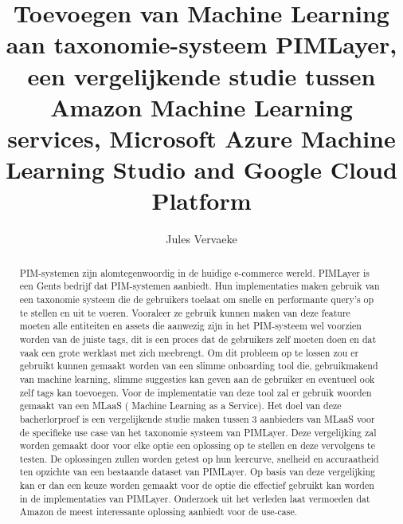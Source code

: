 \documentclass{hogent-article}
\title{Toevoegen van Machine Learning aan taxonomie-systeem PIMLayer, een vergelijkende studie tussen Amazon Machine Learning services, Microsoft Azure Machine Learning Studio and Google Cloud Platform}
\author{Jules Vervaeke}
\begin{document}
\begin{abstract}
  PIM-systemen zijn alomtegenwoordig in de huidige e-commerce wereld. PIMLayer is een Gents bedrijf dat PIM-systemen aanbiedt. Hun implementaties maken gebruik van een taxonomie systeem die de gebruikers toelaat om snelle en performante query's op te stellen en uit te voeren. Vooraleer ze gebruik kunnen maken van deze feature moeten alle entiteiten en assets die aanwezig zijn in het PIM-systeem wel voorzien worden van de juiste tags, dit is een proces dat de gebruikers zelf moeten doen en dat vaak een  grote werklast met zich meebrengt. Om dit probleem op te lossen zou er gebruikt kunnen gemaakt worden van een slimme onboarding tool die, gebruikmakend van machine learning, slimme suggesties kan geven aan de gebruiker en eventueel ook zelf tags kan toevoegen. Voor de implementatie van deze tool zal er gebruik woorden gemaakt van een MLaaS ( Machine Learning as a Service). Het doel van deze bacherlorproef is een vergelijkende studie maken tussen 3 aanbieders van MLaaS voor de specifieke use case van het taxonomie systeem van PIMLayer. Deze vergelijking zal worden gemaakt door voor elke optie een oplossing op te stellen en deze vervolgens te testen. De oplossingen zullen worden getest op hun leercurve, snelheid en accuraatheid ten opzichte van een bestaande dataset van PIMLayer. Op basis van deze vergelijking kan er dan een keuze worden gemaakt voor de optie die effectief gebruikt kan worden in de implementaties van PIMLayer. Onderzoek uit het verleden laat vermoeden dat Amazon de meest interessante oplossing aanbiedt voor de use-case.
\end{abstract}

\tableofcontents



\printbibliography[heading=bibintoc]
\end{document}
